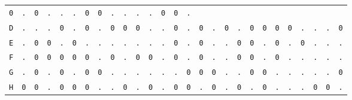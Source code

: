 \begin{figure}[H]
\begin{center}
{\begin{tabular}{c|cccccccccccccccccccccccccc}
        \texttt{0} & \texttt{.} & \texttt{0} & \texttt{.} &
        \texttt{.} & \texttt{.} & \texttt{0} & \texttt{0} &
        \texttt{.} & \texttt{.} & \texttt{.} & \texttt{.} &
        \texttt{0} & \texttt{0} & \texttt{.}                             \\
        \texttt{D} & \texttt{.} & \texttt{.} & \texttt{.} &
        \texttt{0} & \texttt{.} & \texttt{0} & \texttt{.} &
        \texttt{0} & \texttt{0} & \texttt{0} & \texttt{.} &
        \texttt{.} & \texttt{0} & \texttt{.} & \texttt{0} &
        \texttt{.} & \texttt{0} & \texttt{.} & \texttt{0} &
        \texttt{0} & \texttt{0} & \texttt{0} & \texttt{.} &
        \texttt{.} & \texttt{.} & \texttt{0}                             \\
        \texttt{E} & \texttt{.} & \texttt{0} & \texttt{0} &
        \texttt{.} & \texttt{0} & \texttt{.} & \texttt{.} &
        \texttt{.} & \texttt{.} & \texttt{.} & \texttt{.} &
        \texttt{.} & \texttt{0} & \texttt{.} & \texttt{0} &
        \texttt{.} & \texttt{.} & \texttt{0} & \texttt{0} &
        \texttt{.} & \texttt{0} & \texttt{.} & \texttt{0} &
        \texttt{.} & \texttt{.} & \texttt{.}                             \\
        \texttt{F} & \texttt{.} & \texttt{0} & \texttt{0} &
        \texttt{0} & \texttt{0} & \texttt{0} & \texttt{.} &
        \texttt{0} & \texttt{.} & \texttt{0} & \texttt{0} &
        \texttt{.} & \texttt{0} & \texttt{.} & \texttt{0} &
        \texttt{.} & \texttt{.} & \texttt{0} & \texttt{0} &
        \texttt{.} & \texttt{0} & \texttt{.} & \texttt{.} &
        \texttt{.} & \texttt{.} & \texttt{.}                             \\
        \texttt{G} & \texttt{.} & \texttt{0} & \texttt{.} &
        \texttt{0} & \texttt{.} & \texttt{0} & \texttt{0} &
        \texttt{.} & \texttt{.} & \texttt{.} & \texttt{.} &
        \texttt{.} & \texttt{.} & \texttt{0} & \texttt{0} &
        \texttt{0} & \texttt{.} & \texttt{.} & \texttt{0} &
        \texttt{0} & \texttt{.} & \texttt{.} & \texttt{.} &
        \texttt{.} & \texttt{.} & \texttt{0}                             \\
        \texttt{H} & \texttt{0} & \texttt{0} & \texttt{.} &
        \texttt{0} & \texttt{0} & \texttt{0} & \texttt{.} &
        \texttt{.} & \texttt{0} & \texttt{.} & \texttt{0} &
        \texttt{.} & \texttt{0} & \texttt{0} & \texttt{.} &
        \texttt{0} & \texttt{.} & \texttt{0} & \texttt{.} &
        \texttt{0} & \texttt{.} & \texttt{.} & \texttt{.} &
        \texttt{0} & \texttt{0} & \texttt{.}                             \\

\end{tabular}}
\end{center}
\end{figure}
